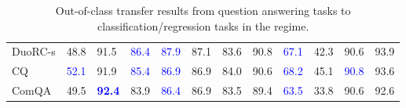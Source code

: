 \begin{landscape}
\begin{table}[t]
\begin{adjustbox}{max width=2\textwidth}
\begin{tabular}{ l l l l l  l l l l  l l l }
DuoRC-s & 48.8 & 91.5 & \textcolor{blue}{86.4} & \textcolor{blue}{87.9} & 87.1 & 83.6 & 90.8 & \textcolor{blue}{67.1} & 42.3 & 90.6 & 93.9\\
CQ & \textcolor{blue}{52.1} & 91.9 & \textcolor{blue}{85.4} & \textcolor{blue}{86.9} & 86.9 & 84.0 & 90.6 & \textcolor{blue}{68.2} & 45.1 & \textcolor{blue}{90.8} & 93.6\\
ComQA & 49.5 & \textbf{\textcolor{blue}{92.4}} & 83.9 & \textcolor{blue}{86.4} & 86.9 & 83.5 & 89.4 & \textcolor{blue}{63.5} & 33.8 & 90.6 & 92.6\\
\bottomrule
\end{tabular}
\end{adjustbox}
\caption{Out-of-class transfer results from question answering tasks to classification/regression tasks in the  regime.}
\label{tbla7a}
\end{table}
\end{landscape}